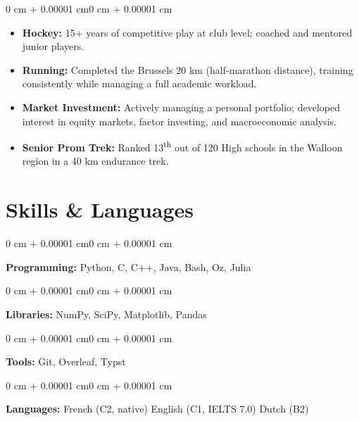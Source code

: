 \documentclass[10pt, letterpaper]{article}
\newenvironment{highlightsforbulletentries}{
    \begin{itemize}[
        topsep=0.06 cm,
        parsep=0.06 cm,
        partopsep=0pt,
        itemsep=0pt,
        leftmargin=10pt
    ]
}{
    \end{itemize}
}
\newenvironment{onecolentry}{
    \begin{adjustwidth}{0 cm + 0.00001 cm}{0 cm + 0.00001 cm}
}{
    \end{adjustwidth}
}
\begin{document}
        \begin{onecolentry}
            \begin{highlightsforbulletentries}
                \item \textbf{Hockey:} 15+ years of competitive play at club level; coached and mentored junior players.
                \item \textbf{Running:} Completed the Brussels 20 km (half-marathon distance), training consistently while managing a full academic workload.
                \item \textbf{Market Investment:} Actively managing a personal portfolio; developed interest in equity markets, factor investing, and macroeconomic analysis.
                \item \textbf{Senior Prom Trek:} Ranked 13\textsuperscript{th} out of 120 High schools in the Walloon region in a 40 km endurance trek.
            \end{highlightsforbulletentries}
        \end{onecolentry}

    \section{Skills \& Languages}

        \begin{onecolentry}
            \textbf{Programming:} Python, C, C++, Java, Bash, Oz, Julia
        \end{onecolentry}
        \vspace{0.02 cm}
        \begin{onecolentry}
            \textbf{Libraries:} NumPy, SciPy, Matplotlib, Pandas
        \end{onecolentry}
        \vspace{0.02 cm}
        \begin{onecolentry}
            \textbf{Tools:} Git, Overleaf, Typst
        \end{onecolentry}
        \vspace{0.02 cm}
        \begin{onecolentry}
            \textbf{Languages:} French (C2, native) \kern 5pt\AND\kern 5pt English (C1, IELTS 7.0) \kern 5pt\AND\kern 5pt Dutch (B2)
        \end{onecolentry}
\end{document}
